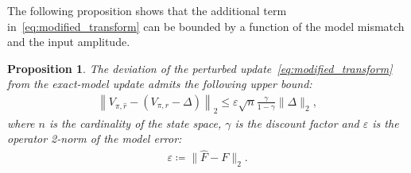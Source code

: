 \documentclass[10pt,leqno]{amsart}
\newcommand{\cost}{r}
\newcommand{\Vsym}{V}
\newcommand{\Varg}[1]{\Vsym_{#1}}
\newcommand{\F}{F}
\newcommand{\Fapx}{\hat{F}}
\newcommand{\policy}{\pi}
\newcommand{\disc}{\gamma}
\newtheorem{proposition}[theorem]{Proposition}
\begin{document}
\noindent The following proposition shows that the additional term in~\eqref{eq:modified_transform} can be bounded by a function of the model mismatch and the input amplitude.
\begin{proposition}
    The deviation of the perturbed update~\eqref{eq:modified_transform} from the exact-model update admits the following upper bound:
    \begin{align}
        \left\|\Varg{\policy, \hat{\cost}} - (\Varg{\policy, \cost} - \Delta) \right\|_2 \leq \varepsilon \sqrt{n} \frac{\disc}{1 - \disc} \|\Delta\|_2,
    \end{align}
    where $n$ is the cardinality of the state space, $\disc$ is the discount factor and $\varepsilon$ is the operator 2-norm of the model error:
    \begin{align*}
        \varepsilon \coloneqq \bigl\|\Fapx - \F\bigr\|_2.
    \end{align*}
\end{proposition}
\end{document}

